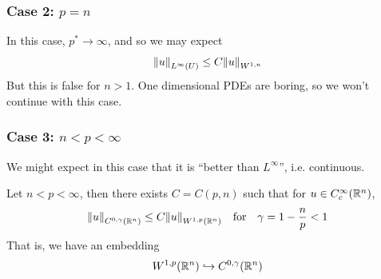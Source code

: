 \documentclass{article}
\begin{document}
\subsubsection*{Case 2: \(p = n\)}

In this case, \(p^* \to \infty\), and so we may expect
\[\norm{u}_{L^\infty(U)} \le C\norm{u}_{W^{1, n}}\]
But this is false for \(n > 1\). One dimensional PDEs are boring, so we won't continue with this case.

\subsubsection*{Case 3: \(n < p < \infty\)}

We might expect in this case that it is ``better than \(L^\infty\)'', i.e. continuous.

\begin{theorem}
     Let \(n < p < \infty\), then there exists \(C = C(p, n)\) such that for \(u \in C_c^\infty(\mathbb{R}^n)\),
    \[\norm{u}_{C^{0, \gamma}(\R^n)} \le C \norm{u}_{W^{1, p}(\R^n)} \qqtext{for} \gamma = 1 - \frac{n}{p} < 1\]
    That is, we have an embedding
    \[W^{1, p}(\mathbb{R}^n) \hookrightarrow C^{0, \gamma}(\mathbb{R}^n)\]
\end{theorem}
\end{document}
